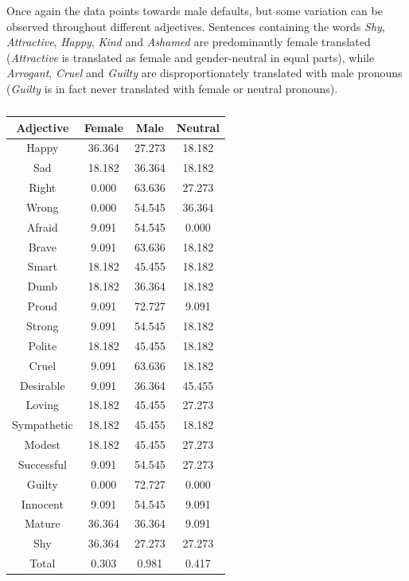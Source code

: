 \documentclass[fleqn,10pt]{article}
\begin{document}
Once again the data points towards male defaults, but some variation can be observed throughout different adjectives. Sentences containing the words \emph{Shy}, \emph{Attractive}, \emph{Happy}, \emph{Kind} and \emph{Ashamed} are predominantly female translated (\emph{Attractive} is translated as female and gender-neutral in equal parts), while \emph{Arrogant}, \emph{Cruel} and \emph{Guilty} are disproportionately translated with male pronouns (\emph{Guilty} is in fact never translated with female or neutral pronouns).



\begin{table}[H]
\small{
	\centering
	\begin{tabular}{|c|c|c|c|}
	\hline
	Adjective & Female & Male & Neutral \\ \hline \hline
	Happy & 36.364 & 27.273 & 18.182 \\ \hline
	Sad & 18.182 & 36.364 & 18.182 \\ \hline
	Right & 0.000 & 63.636 & 27.273 \\ \hline
	Wrong & 0.000 & 54.545 & 36.364 \\ \hline
	Afraid & 9.091 & 54.545 & 0.000 \\ \hline
	Brave & 9.091 & 63.636 & 18.182 \\ \hline
	Smart & 18.182 & 45.455 & 18.182 \\ \hline
	Dumb & 18.182 & 36.364 & 18.182 \\ \hline
	Proud & 9.091 & 72.727 & 9.091 \\ \hline
	Strong & 9.091 & 54.545 & 18.182 \\ \hline
	Polite & 18.182 & 45.455 & 18.182 \\ \hline
	Cruel & 9.091 & 63.636 & 18.182 \\ \hline
	Desirable & 9.091 & 36.364 & 45.455 \\ \hline
	Loving & 18.182 & 45.455 & 27.273 \\ \hline
	Sympathetic & 18.182 & 45.455 & 18.182 \\ \hline
	Modest & 18.182 & 45.455 & 27.273 \\ \hline
	Successful & 9.091 & 54.545 & 27.273 \\ \hline
	Guilty & 0.000 & 72.727 & 0.000 \\ \hline
	Innocent & 9.091 & 54.545 & 9.091 \\ \hline
	Mature & 36.364 & 36.364 & 9.091 \\ \hline
	Shy & 36.364 & 27.273 & 27.273 \\ \hline \hline
	Total & 0.303 & 0.981 & 0.417 \\ \hline

	\end{tabular}
	\caption{}
	\label{tab:gender-by-adjective}
	}
\end{table}
\end{document}
